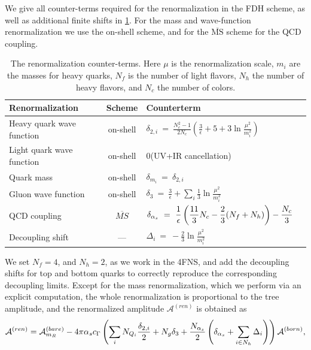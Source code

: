 We give all counter-terms required for the renormalization in the FDH scheme, as well as additional finite shifts in \cref{tab:renorm}.
For the mass and wave-function renormalization we use the on-shell scheme,
and for the $\overline{\text{MS}}$ scheme for the QCD coupling.
\begin{table}[h]
  \begin{tabular}{lcll}
    \textbf{Renormalization} & \textbf{Scheme} & \textbf{Counterterm} \\
    \toprule
    Heavy quark wave function   & on-shell & $\displaystyle \delta_{2,i} ~=~ \frac{N_c^2-1}{2N_c} \left( \frac{3}{\epsilon} + 5 + 3 \ln{\frac{\mu^2}{m_i^2}} \right)$\\
    Light quark wave function   & on-shell & 0\qquad(UV+IR cancellation) \\
    Quark mass            & on-shell & $\displaystyle \delta_{m_i} ~=~ \delta_{2,i}\quad\text{}$\\
    Gluon wave function   & on-shell & $\displaystyle \delta_3 ~=~ \frac{3}{\epsilon} + \sum_i \frac{1}{3}\ln{\frac{\mu^2}{m_i^2}}$\\
    QCD coupling & $\overline{MS}$ & $\displaystyle \delta_{\alpha_s} ~=~ \frac{1}{\epsilon} \left( \frac{11}{3}N_c - \frac{2}{3}(N_f+N_h) \right) - \frac{N_c}{3}$\\
    \midrule
    Decoupling shift & --- & $\displaystyle     \Delta_i ~=~  -\frac{2}{3}\ln{\frac{\mu^2}{m_i^2}} $\\
    \bottomrule
  \end{tabular}
  \caption{The renormalization counter-terms. Here $\mu$ is the renormalization
    scale, $m_{i}$ are the masses for heavy quarks, $N_f$ is the number of light flavors,
    $N_h$ the number of heavy flavors, and $N_c$ the number of colors.
  }
  \label{tab:renorm}
\end{table}
We set $N_f=4$, and $N_h=2$, as we work in the 4FNS, and 
add the decoupling shifts for top and bottom quarks to correctly reproduce the corresponding decoupling limits.
Except for the mass renormalization, which we perform via an explicit computation,
the whole renormalization is proportional to the tree amplitude, 
and the renormalized amplitude $\mathcal{A}^{(ren)}$ is
obtained as
\begin{equation}
  \mathcal{A}^{(ren)} =
  \mathcal{A}^{(bare)}_{m_R} - 4\pi \alpha_s c_\Gamma 
  \left( \sum_i N_{Q_i} \frac{\delta_{2,i}}{2} + N_{g}\delta_3 + \frac{N_{\alpha_s}}{2}\left(\delta_{\alpha_s} + \sum_{i\in N_h}\Delta_i\right) \right)  \mathcal{A}^{(born)},
  \label{renfull}
\end{equation}
